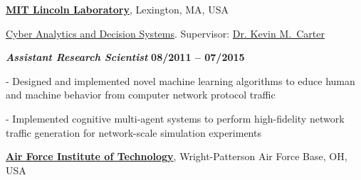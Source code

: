\documentclass[10pt]{article}
\newcommand{\halfblankline}{\quad\vspace{-0.5\baselineskip}\pagebreak[3]}
\begin{document}





\halfblankline








\href{http://www.ll.mit.edu/}{\textbf{MIT Lincoln Laboratory}},
Lexington, MA, USA

\href{https://www.ll.mit.edu/mission/cybersec/CADS/CADS.html}
{Cyber Analytics and Decision Systems}.
Supervisor:
\href{https://www.ll.mit.edu/mission/cybersec/cybersec-bios/carter-bio.html}
{Dr. Kevin M.~Carter}

\vspace{-0.5em}

\begin{outerlist}

\item[] {\normalsize \textbf{\textit{Assistant Research Scientist}}}%
\hfill \textbf{08/2011 -- 07/2015}

\begin{innerlist}

\item[-] Designed and implemented novel machine learning algorithms to educe human and machine behavior from computer network protocol traffic

\item[-] Implemented cognitive multi-agent systems to perform high-fidelity network traffic generation for network-scale simulation experiments

%
%

\end{innerlist}
\end{outerlist}

\halfblankline

\href{http://www.ll.mit.edu/}{\textbf{Air Force Institute of Technology}},
Wright-Patterson Air Force Base, OH, USA
\end{document}
